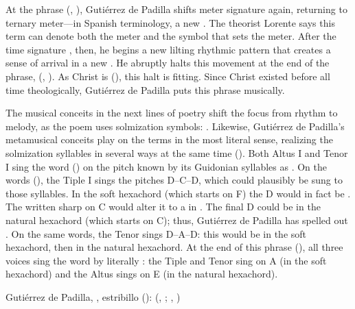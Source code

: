 At the phrase  (, ), Gutiérrez de Padilla shifts meter signature
again, returning to ternary meter---in Spanish terminology, a new .
The theorist Lorente says this term can denote both the meter and the symbol
that sets the meter.%
    \Autocite[, 149]{Lorente:Porque}
After the time signature \meterCZ, then, he begins a new lilting rhythmic
pattern that creates a sense of arrival in a new .
He abruptly halts this movement at the end of the phrase,  (, ).
As Christ is  (), this halt is
fitting.
Since Christ existed before all time theologically, Gutiérrez de Padilla puts
this phrase  musically.


The musical conceits in the next lines of poetry shift the focus from rhythm to
melody, as the poem uses solmization symbols: .
Likewise, Gutiérrez de Padilla's metamusical conceits play on the terms in the
most literal sense, realizing the solmization syllables in several ways at the
same time ().
Both Altus I and Tenor I sing the word  () on the pitch
known by its Guidonian syllables as .
On the words  (), the Tiple I sings the
pitches D--C\sh{}--D, which could plausibly be sung to those syllables.
In the soft hexachord (which starts on F) the D would in fact be .
The written sharp on C would alter it to a  in . 
The final D could be  in the natural hexachord (which starts on C);
thus, Gutiérrez de Padilla has spelled out .
On the same words, the Tenor sings D--A--D: this would be  in the
soft hexachord, then  in the natural hexachord.
At the end of this phrase (), all three voices sing the word
 by literally : the Tiple and
Tenor sing  on A (in the soft hexachord) and the Altus sings 
on E (in the natural hexachord).


{Gutiérrez de Padilla, , estribillo
():  (,
; , )}

